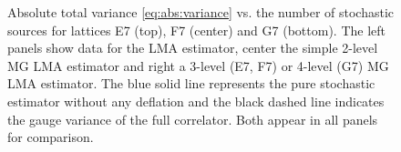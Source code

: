 \begin{figure}
\centering
{}
\hfill
{}
\hfill
{}
\caption{
Absolute total variance \cref{eq:abs:variance} vs. the number of stochastic sources for lattices E7 (top), F7 (center) and G7 (bottom).
The left panels show data for the LMA estimator, center the simple 2-level MG LMA estimator and right a 3-level (E7, F7) or 4-level (G7) MG LMA estimator.
The blue solid line represents the pure stochastic estimator without any deflation and the black dashed line indicates the gauge variance of the full correlator.
Both appear in all panels for comparison.
\takenpart
}
\label{fig:var:vs:sources}
\end{figure}



